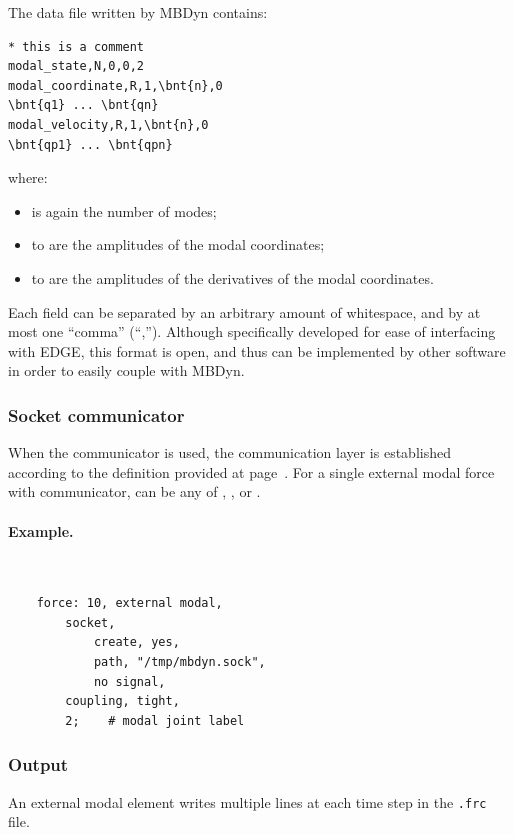 The data file written by MBDyn contains:
\begin{Verbatim}[commandchars=\\\{\}]
* this is a comment
modal_state,N,0,0,2
modal_coordinate,R,1,\bnt{n},0
\bnt{q1} ... \bnt{qn}
modal_velocity,R,1,\bnt{n},0
\bnt{qp1} ... \bnt{qpn}
\end{Verbatim}
where:
\begin{itemize}
\item {} is again the number of modes;
\item {} to  are the amplitudes of the modal coordinates;
\item {} to  are the amplitudes of the derivatives
	of the modal coordinates.
\end{itemize}

Each field can be separated by an arbitrary amount of whitespace,
and by at most one ``comma'' (``,'').
Although specifically developed for ease of interfacing with EDGE,
this format is open, and thus can be implemented by other software
in order to easily couple with MBDyn.



\subsubsection{Socket communicator}
When the  communicator is used,
the communication layer is established according to the definition
provided at page~\pageref{sec:el:forces:comm:socket}.
For a single external modal force with  communicator,
 can be any of , , or .

\paragraph{Example.} \
\begin{verbatim}
    force: 10, external modal,
        socket,
            create, yes,
            path, "/tmp/mbdyn.sock",
            no signal,
        coupling, tight,
        2;    # modal joint label
\end{verbatim}


\subsubsection{Output}
An external modal element writes multiple lines at each time step
in the \texttt{.frc} file.


